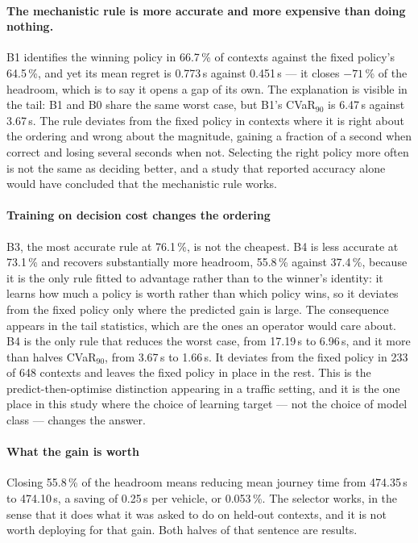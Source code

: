 \documentclass[preprint,12pt]{elsarticle}
\begin{document}
\paragraph{The mechanistic rule is more accurate and more expensive than doing
nothing.} B1 identifies the winning policy in 66.7\,\% of contexts against the
fixed policy's 64.5\,\%, and yet its mean regret is 0.773\,s against 0.451\,s ---
it closes $-71$\,\% of the headroom, which is to say it opens a gap of its own.
The explanation is visible in the tail: B1 and B0 share the same worst case, but
B1's CVaR$_{90}$ is 6.47\,s against 3.67\,s. The rule deviates from the fixed
policy in contexts where it is right about the ordering and wrong about the
magnitude, gaining a fraction of a second when correct and losing several seconds
when not. Selecting the right policy more often is not the same as deciding
better, and a study that reported accuracy alone would have concluded that the
mechanistic rule works.

\paragraph{Training on decision cost changes the ordering} B3, the most accurate
rule at 76.1\,\%, is not the cheapest. B4 is less accurate at 73.1\,\% and
recovers substantially more headroom, 55.8\,\% against 37.4\,\%, because it is the
only rule fitted to advantage rather than to the winner's identity: it learns how
much a policy is worth rather than which policy wins, so it deviates from the
fixed policy only where the predicted gain is large. The consequence appears in
the tail statistics, which are the ones an operator would care about. B4 is the
only rule that reduces the worst case, from 17.19\,s to 6.96\,s, and it more than
halves CVaR$_{90}$, from 3.67\,s to 1.66\,s. It deviates from the fixed policy in
233 of 648 contexts and leaves the fixed policy in place in the rest. This is the
predict-then-optimise distinction \citep{elmachtoub2022spo} appearing in a traffic
setting, and it is the one place in this study where the choice of learning target
--- not the choice of model class --- changes the answer.

\paragraph{What the gain is worth} Closing 55.8\,\% of the headroom means
reducing mean journey time from 474.35\,s to 474.10\,s, a saving of 0.25\,s per
vehicle, or 0.053\,\%. The selector works, in the sense that it does what it was
asked to do on held-out contexts, and it is not worth deploying for that gain.
Both halves of that sentence are results.
\end{document}
